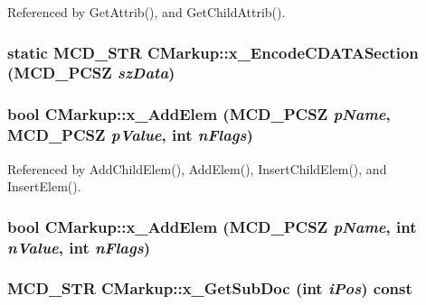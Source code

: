 Referenced by GetAttrib(), and GetChildAttrib().
\subsubsection[x\_\-EncodeCDATASection]{\setlength{\rightskip}{0pt plus 5cm}static MCD\_\-STR CMarkup::x\_\-EncodeCDATASection (MCD\_\-PCSZ {\em szData})\hspace{0.3cm}{\tt  [static, protected]}}\label{classCMarkup_4a107f60dd4e52ef64117cf460da9381}


\subsubsection[x\_\-AddElem]{\setlength{\rightskip}{0pt plus 5cm}bool CMarkup::x\_\-AddElem (MCD\_\-PCSZ {\em pName}, \/  MCD\_\-PCSZ {\em pValue}, \/  int {\em nFlags})\hspace{0.3cm}{\tt  [protected]}}\label{classCMarkup_838bd93651009a22d8feeaa080b1bc1e}




Referenced by AddChildElem(), AddElem(), InsertChildElem(), and InsertElem().
\subsubsection[x\_\-AddElem]{\setlength{\rightskip}{0pt plus 5cm}bool CMarkup::x\_\-AddElem (MCD\_\-PCSZ {\em pName}, \/  int {\em nValue}, \/  int {\em nFlags})\hspace{0.3cm}{\tt  [protected]}}\label{classCMarkup_ad258b7843d396f7b181d10df10d1ba7}


\subsubsection[x\_\-GetSubDoc]{\setlength{\rightskip}{0pt plus 5cm}MCD\_\-STR CMarkup::x\_\-GetSubDoc (int {\em iPos}) const\hspace{0.3cm}{\tt  [protected]}}\label{classCMarkup_4af006666be13b4c295823a343c3ba76}




